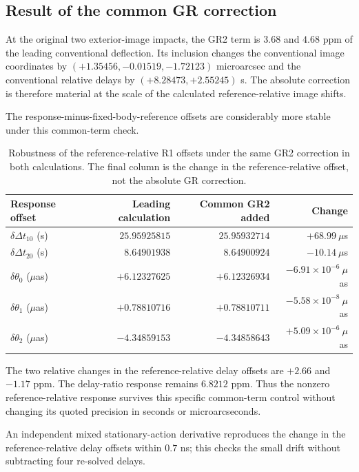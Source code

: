 \subsection{Result of the common GR correction}
\label{sec:gr2-result}
At the original two exterior-image impacts, the GR2 term is $3.68$ and
$4.68$ ppm of the leading conventional deflection. Its inclusion changes
the conventional image coordinates by
$(+1.35456,-0.01519,-1.72123)$ microarcsec and the conventional
relative delays by $(+8.28473,+2.55245)$ s.
The absolute correction is therefore material at the scale of the
calculated reference-relative image shifts.

The response-minus-fixed-body-reference offsets are considerably more
stable under this common-term check.

\begin{table}[htbp]
 \centering
 \caption{Robustness of the reference-relative R1 offsets under
 the same GR2 correction in both calculations. The final column is the change
 in the reference-relative offset, not the absolute GR correction.}
 \label{tab:gr2-control}
 \begin{tabular}{lrrr}
 \toprule
 Response offset & Leading calculation & Common GR2 added & Change\\
 \midrule
 $\delta\Delta t_{10}$ (s) & $25.95925815$ & $25.95932714$ & $+68.99\ \mu$s\\
 $\delta\Delta t_{20}$ (s) & $8.64901938$ & $8.64900924$ & $-10.14\ \mu$s\\
 $\delta\theta_0$ ($\mu$as) & $+6.12327625$ & $+6.12326934$ & $-6.91\times10^{-6}\ \mu$as\\
 $\delta\theta_1$ ($\mu$as) & $+0.78810716$ & $+0.78810711$ & $-5.58\times10^{-8}\ \mu$as\\
 $\delta\theta_2$ ($\mu$as) & $-4.34859153$ & $-4.34858643$ & $+5.09\times10^{-6}\ \mu$as\\
 \bottomrule
 \end{tabular}
\end{table}

The two relative changes in the reference-relative delay offsets are
$+2.66$ and $-1.17$ ppm. The delay-ratio response remains $6.8212$ ppm.
Thus the nonzero reference-relative response survives this specific common-term
control without changing its quoted precision in seconds or microarcseconds.

An independent mixed stationary-action derivative reproduces the change
in the reference-relative delay offsets within $0.7$ ns; this checks the small
drift without subtracting four re-solved delays.

